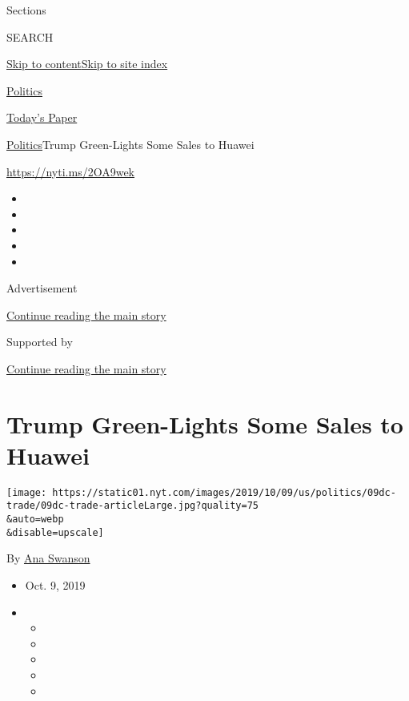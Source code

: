 Sections

SEARCH

\protect\hyperlink{site-content}{Skip to
content}\protect\hyperlink{site-index}{Skip to site index}

\href{https://www.nytimes.com/section/politics}{Politics}

\href{https://myaccount.nytimes.com/auth/login?response_type=cookie\&client_id=vi}{}

\href{https://www.nytimes.com/section/todayspaper}{Today's Paper}

\href{/section/politics}{Politics}\textbar{}Trump Green-Lights Some
Sales to Huawei

\url{https://nyti.ms/2OA9wek}

\begin{itemize}
\item
\item
\item
\item
\item
\end{itemize}

Advertisement

\protect\hyperlink{after-top}{Continue reading the main story}

Supported by

\protect\hyperlink{after-sponsor}{Continue reading the main story}

\hypertarget{trump-green-lights-some-sales-to-huawei}{%
\section{Trump Green-Lights Some Sales to
Huawei}\label{trump-green-lights-some-sales-to-huawei}}

\texttt{[image: https://static01.nyt.com/images/2019/10/09/us/politics/09dc-trade/09dc-trade-articleLarge.jpg?quality=75\\\&auto=webp\\\&disable=upscale]}

By \href{https://www.nytimes.com/by/ana-swanson}{Ana Swanson}

\begin{itemize}
\item
  Oct. 9, 2019
\item
  \begin{itemize}
  \item
  \item
  \item
  \item
  \item
  \end{itemize}
\end{itemize}


